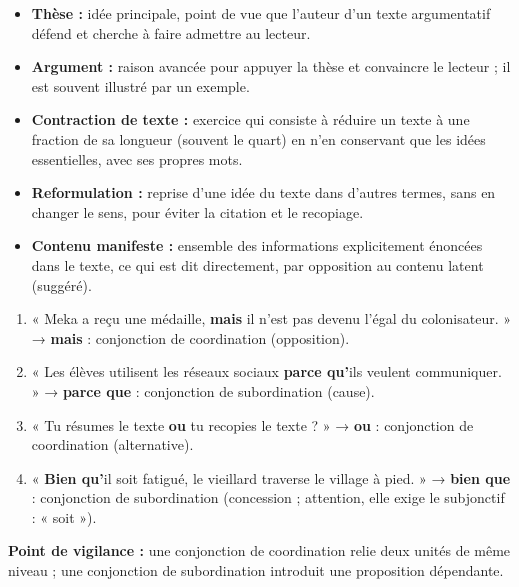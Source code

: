 \documentclass[11pt]{article}
\newcommand{\cle}[1]{{\popxbold\color{popdark}#1}}
\begin{document}
\begin{corrige}
\begin{itemize}
\item \textbf{Thèse :} idée principale, point de vue que l'auteur d'un texte argumentatif défend et cherche à faire admettre au lecteur.
\item \textbf{Argument :} raison avancée pour appuyer la thèse et convaincre le lecteur ; il est souvent illustré par un exemple.
\item \textbf{Contraction de texte :} exercice qui consiste à réduire un texte à une fraction de sa longueur (souvent le quart) en n'en conservant que les idées essentielles, avec ses propres mots.
\item \textbf{Reformulation :} reprise d'une idée du texte dans d'autres termes, sans en changer le sens, pour éviter la citation et le recopiage.
\item \textbf{Contenu manifeste :} ensemble des informations explicitement énoncées dans le texte, ce qui est dit directement, par opposition au contenu latent (suggéré).
\end{itemize}
\end{corrige}

\begin{corrige}
\begin{enumerate}
\item « Meka a reçu une médaille, \textbf{mais} il n'est pas devenu l'égal du colonisateur. » → \textbf{mais} : conjonction de \cle{coordination} (opposition).
\item « Les élèves utilisent les réseaux sociaux \textbf{parce qu'}ils veulent communiquer. » → \textbf{parce que} : conjonction de \cle{subordination} (cause).
\item « Tu résumes le texte \textbf{ou} tu recopies le texte ? » → \textbf{ou} : conjonction de \cle{coordination} (alternative).
\item « \textbf{Bien qu'}il soit fatigué, le vieillard traverse le village à pied. » → \textbf{bien que} : conjonction de \cle{subordination} (concession ; attention, elle exige le subjonctif : « soit »).
\end{enumerate}
\textbf{Point de vigilance :} une conjonction de coordination relie deux unités de même niveau ; une conjonction de subordination introduit une proposition dépendante.
\end{corrige}
\end{document}
